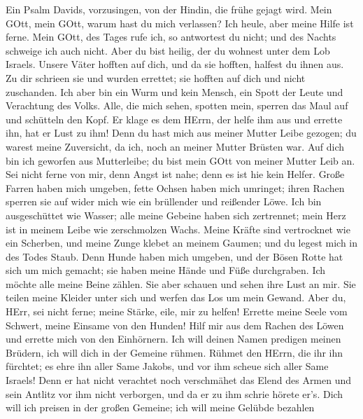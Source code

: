  Ein Psalm Davids, vorzusingen, von der Hindin, die frühe
gejagt wird.  Mein GOtt, mein GOtt, warum hast du mich
verlassen? Ich heule, aber meine Hilfe ist ferne.  Mein
GOtt, des Tages rufe ich, so antwortest du nicht; und des Nachts
schweige ich auch nicht.  Aber du bist heilig, der du
wohnest unter dem Lob Israels.  Unsere Väter hofften auf
dich, und da sie hofften, halfest du ihnen aus.  Zu dir
schrieen sie und wurden errettet; sie hofften auf dich und nicht
zuschanden.  Ich aber bin ein Wurm und kein Mensch, ein
Spott der Leute und Verachtung des Volks.  Alle, die mich
sehen, spotten mein, sperren das Maul auf und schütteln den Kopf.
 Er klage es dem HErrn, der helfe ihm aus und errette ihn,
hat er Lust zu ihm!  Denn du hast mich aus meiner Mutter
Leibe gezogen; du warest meine Zuversicht, da ich, noch an meiner Mutter
Brüsten war.  Auf dich bin ich geworfen aus Mutterleibe; du
bist mein GOtt von meiner Mutter Leib an.  Sei nicht ferne
von mir, denn Angst ist nahe; denn es ist hie kein Helfer. 
Große Farren haben mich umgeben, fette Ochsen haben mich umringet;
 ihren Rachen sperren sie auf wider mich wie ein brüllender
und reißender Löwe.  Ich bin ausgeschüttet wie Wasser; alle
meine Gebeine haben sich zertrennet; mein Herz ist in meinem Leibe wie
zerschmolzen Wachs.  Meine Kräfte sind vertrocknet wie ein
Scherben, und meine Zunge klebet an meinem Gaumen; und du legest mich in
des Todes Staub.  Denn Hunde haben mich umgeben, und der
Bösen Rotte hat sich um mich gemacht; sie haben meine Hände und Füße
durchgraben.  Ich möchte alle meine Beine zählen. Sie aber
schauen und sehen ihre Lust an mir.  Sie teilen meine
Kleider unter sich und werfen das Los um mein Gewand.  Aber
du, HErr, sei nicht ferne; meine Stärke, eile, mir zu helfen!
 Errette meine Seele vom Schwert, meine Einsame von den
Hunden!  Hilf mir aus dem Rachen des Löwen und errette mich
von den Einhörnern.  Ich will deinen Namen predigen meinen
Brüdern, ich will dich in der Gemeine rühmen.  Rühmet den
HErrn, die ihr ihn fürchtet; es ehre ihn aller Same Jakobs, und vor ihm
scheue sich aller Same Israels!  Denn er hat nicht
verachtet noch verschmähet das Elend des Armen und sein Antlitz vor ihm
nicht verborgen, und da er zu ihm schrie hörete er's.  Dich
will ich preisen in der großen Gemeine; ich will meine Gelübde bezahlen
